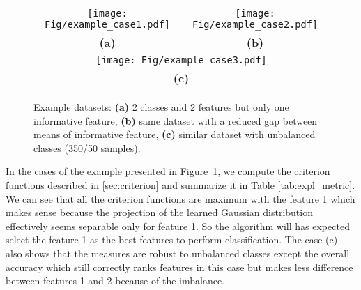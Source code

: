 \documentclass[a4paper,11pt,DIV=16,abstracton]{scrartcl}
\begin{document}
    \begin{figure}[!ht]
        \centering
        \begin{tabular}{cc}
            \texttt{[image: Fig/example\_case1.pdf]} &
            \texttt{[image: Fig/example\_case2.pdf]} \\
            {\bfseries{(a)}} & {\bfseries{(b)}} \\
            \multicolumn{2}{c}{\texttt{[image: Fig/example\_case3.pdf]}} \\
            \multicolumn{2}{c}{{\bfseries{(c)}}} \\
        \end{tabular}
        \caption{Example datasets: {\bfseries{(a)}} 2 classes and 2 features but only one informative feature, {\bfseries{(b)}} same dataset with a reduced gap between means of informative feature, {\bfseries{(c)}} similar dataset with unbalanced classes (350/50 samples).\label{fig:expl_dataset}}
    \end{figure}

    In the cases of the example presented in Figure~\ref{fig:expl_dataset}, we compute the criterion functions described in \ref{sec:criterion} and summarize it in Table \ref{tab:expl_metric}. We can see that all the criterion functions are maximum with the feature 1 which makes sense because the projection of the learned Gaussian distribution effectively seems separable only for feature 1. So the algorithm will has expected select the feature 1 as the best features to perform classification. The case (c) also shows that the measures are robust to unbalanced classes except the overall accuracy which still correctly ranks features in this case but makes less difference between features 1 and 2 because of the imbalance.
\end{document}
